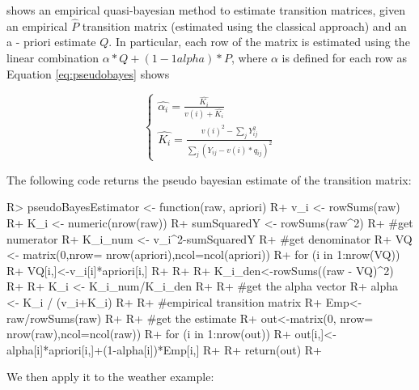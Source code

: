 \documentclass[article,nojss]{jss}
\begin{document}
\cite{Hu2002} shows an empirical quasi-bayesian method to estimate transition matrices, given an empirical \(\hat{P}\) transition matrix (estimated using the classical approach) and an a - priori estimate \(Q\). In particular, each row of the matrix is estimated using the linear combination \(\alpha*Q+\left(1-1alpha\right)*P\), where \(\alpha\) is defined for each row as Equation \ref{eq:pseudobayes} shows

\begin{equation}
\left\{\begin{matrix}
\hat{\alpha_i}=\frac{\hat{K_i}}{v\left(i \right )+\hat{K_i}}\\ 
\hat{K_i}=\frac{v\left(i \right)^2 - \sum_{j}Y_{ij}^2}{\sum_{j}(Y_{ij}-v\left(i \right)*q_{ij})^2}
\end{matrix}\right.
\label{eq:pseudobayes}
\end{equation}

The following code returns the pseudo bayesian estimate of the transition matrix:

\begin{CodeChunk}

\begin{CodeInput}
R> pseudoBayesEstimator <- function(raw, apriori){
R+   v_i <- rowSums(raw) 
R+   K_i <- numeric(nrow(raw))
R+   sumSquaredY <- rowSums(raw^2)
R+   #get numerator
R+   K_i_num <- v_i^2-sumSquaredY
R+   #get denominator
R+   VQ <- matrix(0,nrow= nrow(apriori),ncol=ncol(apriori))
R+   for (i in 1:nrow(VQ)) {
R+     VQ[i,]<-v_i[i]*apriori[i,]
R+   }
R+   
R+   K_i_den<-rowSums((raw - VQ)^2)
R+   
R+   K_i <- K_i_num/K_i_den
R+   
R+   #get the alpha vector
R+   alpha <- K_i / (v_i+K_i)
R+   
R+   #empirical transition matrix
R+   Emp<-raw/rowSums(raw)
R+   
R+   #get the estimate
R+   out<-matrix(0, nrow= nrow(raw),ncol=ncol(raw))
R+   for (i in 1:nrow(out)) {
R+     out[i,]<-alpha[i]*apriori[i,]+(1-alpha[i])*Emp[i,]
R+   }
R+   return(out)
R+ }
\end{CodeInput}
\end{CodeChunk}

We then apply it to the weather example:
\end{document}
